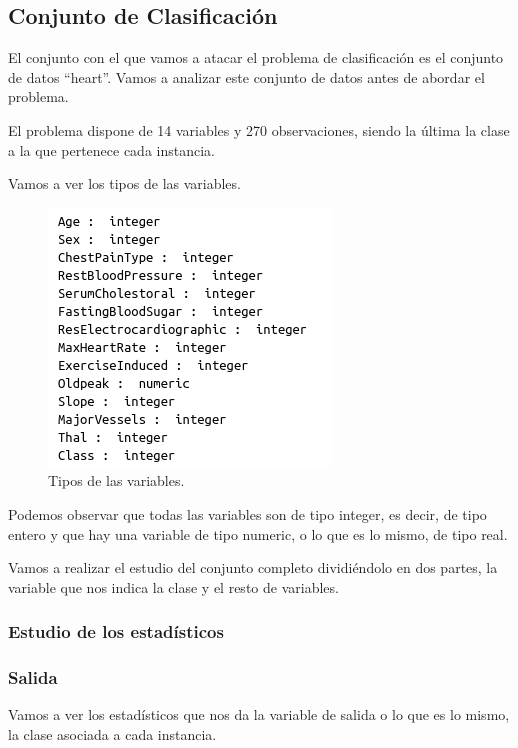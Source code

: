 \documentclass[12pt,a4paper]{article}
\begin{document}
\subsection{Conjunto de Clasificación}

El conjunto con el que vamos a atacar el problema de clasificación es el conjunto de datos ``heart''. Vamos a analizar este conjunto de datos antes de abordar el problema.

El problema dispone de 14 variables y 270 observaciones, siendo la última la clase a la que pertenece cada instancia.

Vamos a ver los tipos de las variables.

\begin{figure}[H]
	\centering
	\includegraphics[scale=0.7]{./Imagenes/EDA/Clasificacion/tipos_variables.png}
	\caption{Tipos de las variables.}
\end{figure}

Podemos observar que todas las variables son de tipo integer, es decir, de tipo entero y que hay una variable de tipo numeric, o lo que es lo mismo, de tipo real.

Vamos a realizar el estudio del conjunto completo dividiéndolo en dos partes, la variable que nos indica la clase y el resto de variables.

\subsubsection{Estudio de los estadísticos}

\subsubsection*{Salida}

Vamos a ver los estadísticos que nos da la variable de salida o lo que es lo mismo, la clase asociada a cada instancia.
\end{document}
